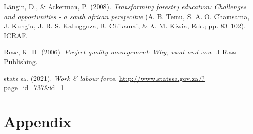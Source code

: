 \documentclass[
  11pt,
]{article}
\newlength{\cslhangindent}
\newenvironment{CSLReferences}[2] %
 {%
  \setlength{\parindent}{0pt}
  \ifodd #1 \everypar{\setlength{\hangindent}{\cslhangindent}}\ignorespaces\fi
  \ifnum #2 > 0
  \setlength{\parskip}{#2\baselineskip}
  \fi
 }%
 {}
\begin{document}
\hypertarget{refs}{}
\begin{CSLReferences}{1}{0}
\leavevmode{}%
Längin, D., \& Ackerman, P. (2008). \emph{Transforming forestry
education: Challenges and opportunities - a south african perspecitve}
(A. B. Temu, S. A. O. Chamsama, J. Kung'u, J. R. S. Kaboggoza, B.
Chikamai, \& A. M. Kiwia, Eds.; pp. 83--102). ICRAF.

\leavevmode{}%
Rose, K. H. (2006). \emph{Project quality management: Why, what and
how}. J Ross Publishing.

\leavevmode{}%
stats sa. (2021). \emph{Work \& labour force}.
\url{http://www.statssa.gov.za/?page_id=737\&id=1}

\end{CSLReferences}

\clearpage

\hypertarget{appendix}{%
\section{Appendix}\label{appendix}}
\end{document}
